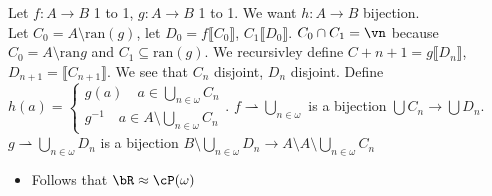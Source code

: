 \begin{pf}
    Let $f: A \to B$ 1 to 1, $g: A \to B$ 1 to 1. We want $h: A \to B$ bijection. \\
    Let $C_0 = A \setminus \text{ran}(g)$, let $D_0 = f \llbracket C_0 \rrbracket$, $C_1 \llbracket D_0 \rrbracket$. $C_0 \cap C_1 = \vn$ because $C_0 = A \setminus \text{ran} g$ and $C_1 \subseteq \text{ran}(g)$. We recursivley define $C+{n+1} = g \llbracket D_n \rrbracket$, $D_{n+1} = \llbracket C_{n+1} \rrbracket$. We see that $C_n$ disjoint, $D_n$ disjoint. Define $h(a) = \begin{cases} g(a) \quad a \in \bigcup_{n \in \omega}C_n \\ g^{-1} \quad a \in A \setminus \bigcup_{n \in \omega}C_n\end{cases}$. $f \rightharpoonup \bigcup_{n \in \omega}$ is a bijection $\bigcup C_n \to \bigcup D_n$. $g\rightharpoonup \bigcup_{n \in \omega}D_n$ is a bijection $B \setminus \bigcup_{n \in \omega}D_n \to A \setminus A \setminus \bigcup_{n \in \omega}C_n$
\end{pf}

\begin{itemize}
    \item Follows that $\bR \approx \cP(\omega)$ 
\end{itemize}